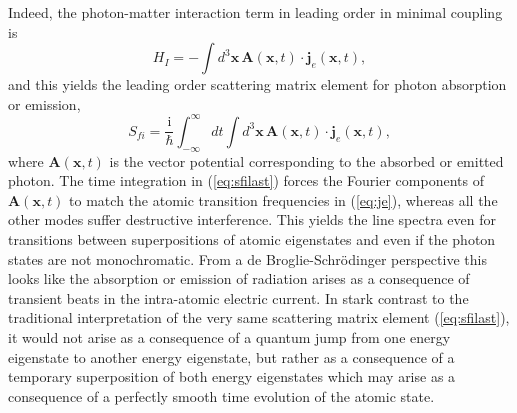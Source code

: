 \documentclass[final,3p,12pt]{elsarticle3}
\begin{document}
Indeed, the photon-matter interaction term in leading order in minimal coupling is
\begin{equation}\label{eq:H1b}
H_I=-\int\!d^3\bm{x}\,\bm{A}(\bm{x},t)\cdot\bm{j}_e(\bm{x},t),
\end{equation}
and this yields the leading order scattering matrix element for
photon absorption or emission,
\begin{equation}\label{eq:sfilast}
S_{\!fi}=\frac{\mathrm{i}}{\hbar}\int_{-\infty}^\infty\!dt
\int\!d^3\bm{x}\,\bm{A}(\bm{x},t)\cdot\bm{j}_e(\bm{x},t),
\end{equation}
where $\bm{A}(\bm{x},t)$ is the vector potential corresponding to the absorbed or 
emitted photon. The time integration in (\ref{eq:sfilast}) forces the Fourier 
components of $\bm{A}(\bm{x},t)$ to match the atomic 
transition frequencies in (\ref{eq:je}), whereas all the 
other modes suffer destructive interference. This yields the line spectra 
even for transitions between superpositions of atomic eigenstates and even if 
the photon states are not monochromatic. From a de Broglie-Schr\"odinger perspective
this looks like the absorption or emission of radiation arises as a consequence
of transient beats in the intra-atomic electric current. In stark contrast to the
traditional interpretation of the very same scattering matrix element (\ref{eq:sfilast}),
it would not arise as a consequence of a quantum jump from one energy eigenstate
to another energy eigenstate, but rather as a consequence of a temporary superposition
of both energy eigenstates which may arise as a consequence of a perfectly smooth
time evolution of the atomic state.
\end{document}
